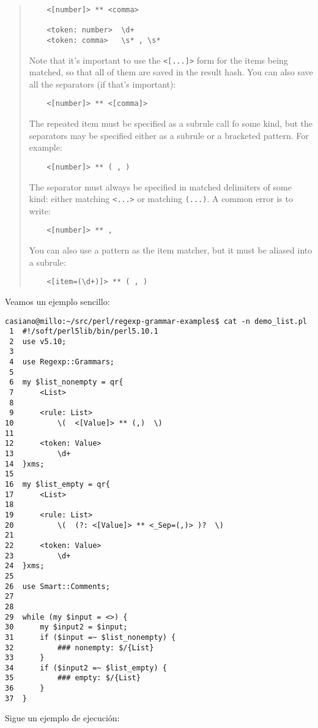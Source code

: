 \begin{it}
\begin{quotation}
\begin{verbatim}
    <[number]> ** <comma>

    <token: number>  \d+
    <token: comma>   \s* , \s*
\end{verbatim}

Note that it's important to use the \verb|<[...]>| form for the items being
matched, so that all of them are saved in the result hash. You can also
save all the separators (if that's important):

\begin{verbatim}
    <[number]> ** <[comma]>
\end{verbatim}

The repeated item must be specified as a subrule call fo some kind,
but the separators may be specified either as a subrule or a bracketed
pattern. For example:

\begin{verbatim}
    <[number]> ** ( , )
\end{verbatim}

The separator must always be specified in matched delimiters of some kind:
either matching \verb|<...>| or matching \verb|(...)|. 
A common error is to write:

\begin{verbatim}
    <[number]> ** ,
\end{verbatim}

You can also use a pattern as the item matcher, but it must be aliased
into a subrule:

\begin{verbatim}
    <[item=(\d+)]> ** ( , )
\end{verbatim}
\end{quotation}\end{it}


Veamos un ejemplo sencillo:

\begin{verbatim}
casiano@millo:~/src/perl/regexp-grammar-examples$ cat -n demo_list.pl
 1  #!/soft/perl5lib/bin/perl5.10.1
 2  use v5.10;
 3
 4  use Regexp::Grammars;
 5
 6  my $list_nonempty = qr{
 7      <List>
 8
 9      <rule: List>
10          \(  <[Value]> ** (,)  \)
11
12      <token: Value>
13          \d+
14  }xms;
15
16  my $list_empty = qr{
17      <List>
18
19      <rule: List>
20          \(  (?: <[Value]> ** <_Sep=(,)> )?  \)
21
22      <token: Value>
23          \d+
24  }xms;
25
26  use Smart::Comments;
27
28
29  while (my $input = <>) {
30      my $input2 = $input;
31      if ($input =~ $list_nonempty) {
32          ### nonempty: $/{List}
33      }
34      if ($input2 =~ $list_empty) {
35          ### empty: $/{List}
36      }
37  }
\end{verbatim}
Sigue un ejemplo de ejecución:

